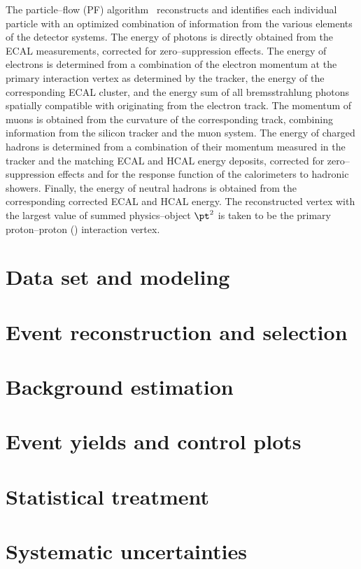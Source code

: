 The particle--flow (PF) algorithm~\cite{ref:particleflow} reconstructs 
and identifies each individual particle with an optimized combination 
of information from the various elements of the detector systems. The 
energy of photons is directly obtained from the ECAL measurements, 
corrected for zero--suppression effects. The energy of electrons is 
determined from a combination of the electron momentum at the primary 
interaction vertex as determined by the tracker, the energy of the 
corresponding ECAL cluster, and the energy sum of all bremsstrahlung 
photons spatially compatible with originating from the electron track. 
The momentum of muons is obtained from the curvature of the 
corresponding track, combining information from the silicon tracker and 
the muon system. The energy of charged hadrons is determined from a 
combination of their momentum measured in the tracker and the matching 
ECAL and HCAL energy deposits, corrected for zero--suppression effects 
and for the response function of the calorimeters to hadronic showers. 
Finally, the energy of neutral hadrons is obtained from the 
corresponding corrected ECAL and HCAL energy. The reconstructed vertex 
with the largest value of summed physics--object $\pt^2$ is taken to be 
the primary proton--proton (\Pp{}\Pp{}) interaction vertex. 

\section{Data set and modeling}
\label{sec:dataset}

\section{Event reconstruction and selection}

\section{Background estimation}

\section{Event yields and control plots}

\section{Statistical treatment}

\section{Systematic uncertainties}

